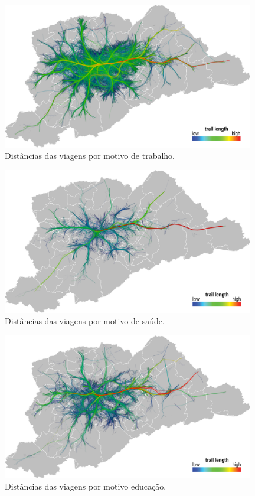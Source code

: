 \begin{figure}[!htb]
\centering
\captionsetup{justification=centering}
\includegraphics[width=0.98\textwidth]{../figuras/reason-work-leg.png}
\caption{Distâncias das viagens por motivo de trabalho.\label{fig:reason-work}}
\end{figure}
  
\begin{figure}[!htb]
\centering
\captionsetup{justification=centering}
\includegraphics[width=0.98\textwidth]{../figuras/reason-health-leg.png}
\caption{Distâncias das viagens por motivo de saúde.\label{fig:reason-health}}
\end{figure}

\begin{figure}[!htb]
\centering
\captionsetup{justification=centering}
\includegraphics[width=0.98\textwidth]{../figuras/reason-school-leg.png}
\caption{Distâncias das viagens por motivo educação.\label{fig:reason-education}}
\end{figure}

